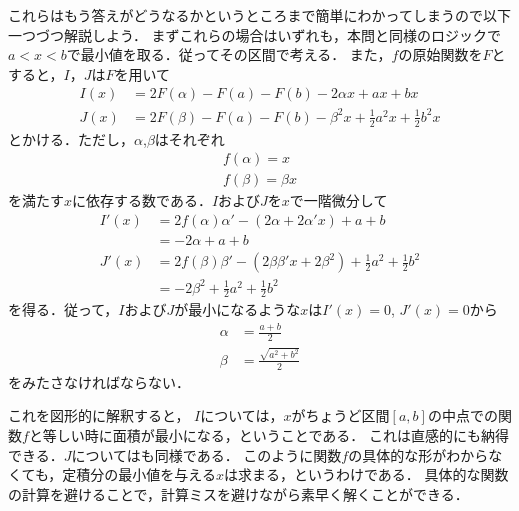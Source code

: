 \documentclass[a4paper,10pt]{ltjsarticle}
\begin{document}
\begin{multicols}{2}
これらはもう答えがどうなるかというところまで簡単にわかってしまうので以下一つづつ解説しよう．
まずこれらの場合はいずれも，本問と同様のロジックで$a<x<b$で最小値を取る．従ってその区間で考える．
また，$f$の原始関数を$F$とすると，$I$，$J$は$F$を用いて
\begin{align}
 I(x) &= 2F(\alpha) - F(a) - F(b) - 2\alpha x + ax + bx \\
 J(x) &= 2F(\beta) - F(a) - F(b)  - \beta^2 x + \frac{1}{2}a^2 x + \frac{1}{2}b^2 x
\end{align}
とかける．ただし，$\alpha$,$\beta$はそれぞれ
\begin{align}
    f(\alpha) = x \\
    f(\beta)  = \beta x
\end{align}
を満たす$x$に依存する数である．$I$および$J$を$x$で一階微分して
\begin{align*}
 I'(x) 
 &= 2f(\alpha)\alpha' - (2\alpha + 2\alpha' x) + a +b \\
 &= -2\alpha + a + b \\
 J'(x) 
 &= 2f(\beta)\beta'   - (2\beta\beta' x + 2\beta^2) + \frac{1}{2}a^2 + \frac{1}{2}b^2 \\
 &= -2\beta^2 + \frac{1}{2}a^2 + \frac{1}{2}b^2
\end{align*}
を得る．従って，$I$および$J$が最小になるような$x$は$I'(x)=0$, $J'(x)=0$から
\begin{align}
 \alpha &= \frac{a+b}{2}  \\
 \beta &= \frac{\sqrt{a^2+b^2}}{2}
\end{align}
をみたさなければならない．

これを図形的に解釈すると，
$I$については，$x$がちょうど区間$[a,b]$の中点での関数$f$と等しい時に面積が最小になる，ということである．
これは直感的にも納得できる．$J$についてはも同様である．
このように関数$f$の具体的な形がわからなくても，定積分の最小値を与える$x$は求まる，というわけである．
具体的な関数の計算を避けることで，計算ミスを避けながら素早く解くことができる．


\end{multicols}
\end{document}
